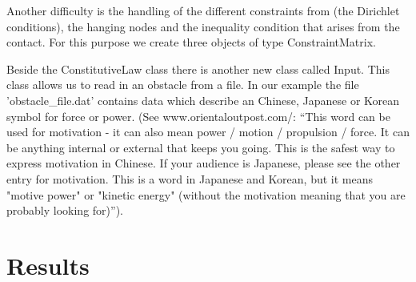\documentclass{article}
\begin{document}
Another difficulty is the handling of the different constraints from
(the Dirichlet conditions), the hanging nodes and the inequality condition that
arises from the contact. For this purpose we create three objects of type
ConstraintMatrix.

Beside the ConstitutiveLaw class there is another new class called Input. This
class allows us to read in an obstacle from a file. In our example the file
'obstacle\_file.dat' contains data which describe an Chinese, Japanese or
Korean symbol for force or power. (See www.orientaloutpost.com/: ``This word can be used for motivation - it
can also mean power / motion / propulsion / force. It can be anything
internal or external that keeps you going. This is the safest way to express
motivation in Chinese. If your audience is Japanese, please see the other entry
for motivation. This is a word in Japanese and Korean, but it means "motive
power" or "kinetic energy" (without the motivation meaning that you are
probably looking for)'').

\section{Results}
\end{document}
